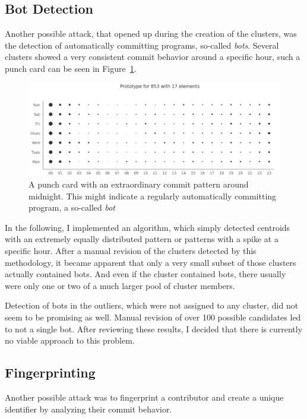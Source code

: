 

\subsection{Bot Detection}
Another possible attack, that opened up during the creation of the clusters, was the detection of automatically committing programs, so-called \emph{bots}.
Several clusters showed a very consistent commit behavior around a specific hour, such a punch card can be seen in Figure~\ref{fig:bot-punchcard}.

\begin{figure}[H]
    \includegraphics[scale=0.32]{./graphs/analysis/bot-punchcard}
    \centering
    \caption{A punch card with an extraordinary commit pattern around midnight. This might indicate a regularly automatically committing program, a so-called \emph{bot}}\label{fig:bot-punchcard}
\end{figure}

In the following, I implemented an algorithm, which simply detected centroids with an extremely equally distributed pattern or patterns with a spike at a specific hour.
After a manual revision of the clusters detected by this methodology, it became apparent that only a very small subset of those clusters actually contained bots.
And even if the cluster contained bots, there usually were only one or two of a much larger pool of cluster members.

Detection of bots in the outliers, which were not assigned to any cluster, did not seem to be promising as well.
Manual revision of over 100 possible candidates led to not a single bot.
After reviewing these results, I decided that there is currently no viable approach to this problem.


\subsection{Fingerprinting}
Another possible attack was to fingerprint a contributor and create a unique identifier by analyzing their commit behavior.

